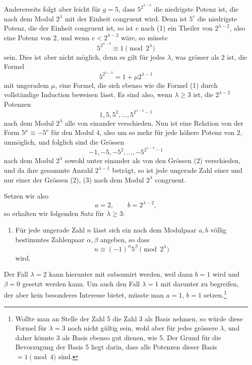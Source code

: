 \documentclass[11pt]{article}
\begin{document}
Andererseits folgt aber leicht für $g=5$, dass $5^{2^{\lambda-3}}$ die niedrigste Potenz ist, die nach dem Modul $2^\lambda$ mit der Einheit congruent wird. Denn ist $5^e$ die niedrigste Potenz, die der Einheit congruent ist, so ist $e$ nach (1) ein Theiler von $2^{\lambda-2}$, also eine Potenz von $2$, und wenn $e<2^{\lambda-2}$ wäre, so müsste
\[
5^{2^{\lambda-3}}\equiv1\pmod{2^\lambda}
\]
sein. Dies ist aber nicht möglich, denn es gilt für jedes $\lambda$, was grösser als $2$ ist, die Formel
\[
5^{2^{\lambda-3}}=1+\mu 2^{\lambda-1}
\]
mit ungeradem $\mu$, eine Formel, die sich ebenso wie die Formel (1) durch vollständige Induction beweisen lässt. Es sind also, wenn $\lambda\ge3$ ist, die $2^{\lambda-2}$ Potenzen
\begin{equation}
1,5,5^2,
\ldots,
5^{2^{\lambda-2}-1}
\tag{2}
\end{equation}
nach dem Modul $2^\lambda$ alle von einander verschieden. Nun ist eine Relation von der Form $5^\mu\equiv-5^\nu$ für den Modul $4$, also um so mehr für jede höhere Potenz von $2$, unmöglich, und folglich sind die Grössen
\begin{equation}
-1,-5,-5^2,
\ldots,
-5^{2^{\lambda-2}-1}
\tag{3}
\end{equation}
nach dem Modul $2^\lambda$ sowohl unter einander als von den Grössen (2) verschieden, und da ihre gesammte Anzahl $2^{\lambda-1}$ beträgt, so ist jede ungerade Zahl einer und nur einer der Grössen (2), (3) nach dem Modul $2^\lambda$ congruent.

Setzen wir also
\begin{equation}
a=2,
\qquad b=2^{\lambda-2},
\tag{4}
\end{equation}
so erhalten wir folgenden Satz für $\lambda\ge3$:

\begin{enumerate}[label=\arabic*.,start=3]
\item Für jede ungerade Zahl $n$ lässt sich ein nach dem Modulpaar $a,b$ völlig bestimmtes Zahlenpaar $\alpha,\beta$ angeben, so dass
\[
n\equiv(-1)^\alpha5^\beta\pmod{2^\lambda}
\]
wird.
\end{enumerate}

Der Fall $\lambda=2$ kann hierunter mit subsumirt werden, weil dann $b=1$ wird und $\beta=0$ gesetzt werden kann. Um auch den Fall $\lambda=1$ mit darunter zu begreifen, der aber kein besonderes Interesse bietet, müsste man $a=1$, $b=1$ setzen.\footnote{Wollte man an Stelle der Zahl 5 die Zahl 3 als Basis nehmen, so würde diese Formel für $\lambda=3$ noch nicht gültig sein, wohl aber für jedes grössere $\lambda$, und daher könnte 3 als Basis ebenso gut dienen, wie 5. Der Grund für die Bevorzugung der Basis 5 liegt darin, dass alle Potenzen dieser Basis $=1\pmod4$ sind.}
\end{document}
